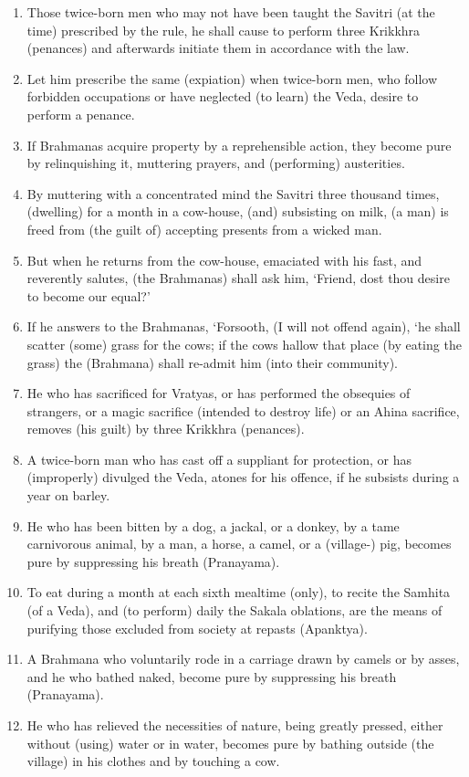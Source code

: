 \begin{enumerate}
\item Those twice-born men who may not have been taught the Savitri (at the time) prescribed by the rule, he shall cause to perform three Krikkhra (penances) and afterwards initiate them in accordance with the law.
\item Let him prescribe the same (expiation) when twice-born men, who follow forbidden occupations or have neglected (to learn) the Veda, desire to perform a penance.
\item If Brahmanas acquire property by a reprehensible action, they become pure by relinquishing it, muttering prayers, and (performing) austerities.
\item By muttering with a concentrated mind the Savitri three thousand times, (dwelling) for a month in a cow-house, (and) subsisting on milk, (a man) is freed from (the guilt of) accepting presents from a wicked man.
\item But when he returns from the cow-house, emaciated with his fast, and reverently salutes, (the Brahmanas) shall ask him, `Friend, dost thou desire to become our equal?'
\item If he answers to the Brahmanas, `Forsooth, (I will not offend again), `he shall scatter (some) grass for the cows; if the cows hallow that place (by eating the grass) the (Brahmana) shall re-admit him (into their community).
\item He who has sacrificed for Vratyas, or has performed the obsequies of strangers, or a magic sacrifice (intended to destroy life) or an Ahina sacrifice, removes (his guilt) by three Krikkhra (penances).
\item A twice-born man who has cast off a suppliant for protection, or has (improperly) divulged the Veda, atones for his offence, if he subsists during a year on barley.
\item He who has been bitten by a dog, a jackal, or a donkey, by a tame carnivorous animal, by a man, a horse, a camel, or a (village-) pig, becomes pure by suppressing his breath (Pranayama).
\item To eat during a month at each sixth mealtime (only), to recite the Samhita (of a Veda), and (to perform) daily the Sakala oblations, are the means of purifying those excluded from society at repasts (Apanktya).
\item A Brahmana who voluntarily rode in a carriage drawn by camels or by asses, and he who bathed naked, become pure by suppressing his breath (Pranayama).
\item He who has relieved the necessities of nature, being greatly pressed, either without (using) water or in water, becomes pure by bathing outside (the village) in his clothes and by touching a cow.

\end{enumerate}
